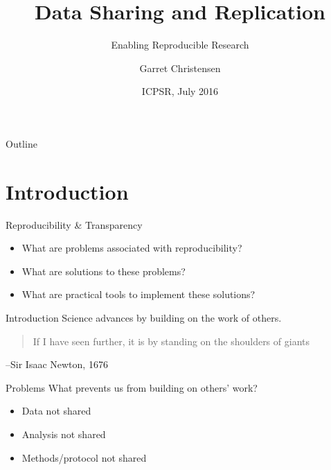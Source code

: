 \documentclass{beamer}
\title[Data Sharing and Replication] %
{Data Sharing and Replication}
\subtitle
{Enabling Reproducible Research} %
\author[Christensen] %
{Garret Christensen\inst{1}}
\institute[UC Berkeley, Berkeley Initiative for Transparency in the Social Sciences] %
{
  \inst{1}%
  UC Berkeley: Berkeley Initiative for Transparency in the Social Sciences\\
  Berkeley Institute for Data Science
}
\date[Short Occasion] %
{ICPSR, July 2016}
\begin{document}


\begin{frame}
  \titlepage
\end{frame}

\begin{frame}{Outline}
  \tableofcontents
\end{frame}


\section{Introduction}
\begin{frame}{Reproducibility \& Transparency}
\begin{itemize}
\item What are problems associated with reproducibility?
\item What are solutions to these problems?
\item What are practical tools to implement these solutions?
\end{itemize}
\end{frame}
\begin{frame}{Introduction}
Science advances by building on the work of others. 
\vspace{0.5in}


\begin{quote}
If I have seen further, it is by standing on the shoulders of giants
\end{quote}
\begin{flushright}
--Sir Isaac Newton, 1676
\end{flushright}
\end{frame}

\begin{frame}{Problems}
What prevents us from building on others' work?
\begin{itemize}[<.->]
 \item Data not shared
 \item Analysis not shared
 \item Methods/protocol not shared 
\end{itemize}
\end{frame}
\end{document}
